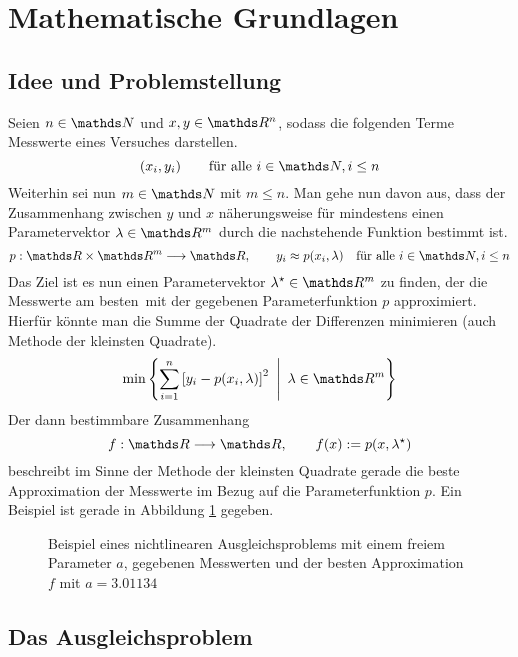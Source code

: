 

\newcommand{\transp}[1]{{#1}^\m{T}}


	
	\articletitle

	\section{Mathematische Grundlagen} %
	\label{sec:mathematische_grundlagen}

		\subsection{Idee und Problemstellung} %
		\label{sub:idee_und_problemstellung}
		
			Seien $n\in\SN$ und $x,y\in\SR^n$, sodass die folgenden Terme Messwerte eines Versuches darstellen.
			\[ (x_i,y_i) \qquad \text{für alle } i\in\SN,i\leq n \]
			Weiterhin sei nun $m\in\SN$ mit $m\leq n$.
			Man gehe nun davon aus, dass der Zusammenhang zwischen $y$ und $x$ näherungsweise für mindestens einen Parametervektor $\lambda\in\SR^m$ durch die nachstehende Funktion bestimmt ist.
			\[ p:\SR\times\SR^m\longrightarrow\SR,\qquad y_i\approx p(x_i,\lambda) \quad \text{für alle } i\in\SN,i\leq n \]
			Das Ziel ist es nun einen Parametervektor $\lambda^\star\in\SR^m$ zu finden, der die Messwerte \glqq am besten\grqq\ mit der gegebenen Parameterfunktion $p$ approximiert.
			Hierfür könnte man die Summe der Quadrate der Differenzen minimieren (auch Methode der kleinsten Quadrate).
			\[ \min\set{\sum_{i=1}^n \boxb{ y_i - p(x_i,\lambda) }^2}{\lambda\in\SR^m} \]
			Der dann bestimmbare Zusammenhang
			\[ f:\SR\longrightarrow\SR,\qquad f(x):=p(x,\lambda^\star) \]
			beschreibt im Sinne der Methode der kleinsten Quadrate gerade die beste Approximation der Messwerte im Bezug auf die Parameterfunktion $p$.
			Ein Beispiel ist gerade in Abbildung \ref{fig:fit-example} gegeben.

			\begin{figure}[h]
				\center
				
				\caption{Beispiel eines nichtlinearen Ausgleichsproblems mit einem freiem Parameter $a$, gegebenen Messwerten und der besten Approximation $f$ mit $a=3.01134$}
				\label{fig:fit-example}
			\end{figure}


		\subsection{Das Ausgleichsproblem} %
		\label{sub:das_ausgleichsproblem}
		
